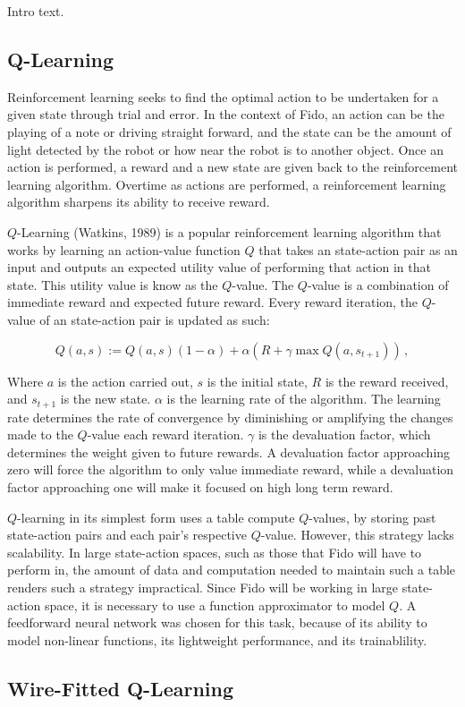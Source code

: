 Intro text.

\subsection{Q-Learning}

Reinforcement learning seeks to find the optimal action to be undertaken for a given state through trial and error. In the context of Fido, an action can be the playing of a note or driving straight forward, and the state can be the amount of light detected by the robot or how near the robot is to another object. Once an action is performed, a reward and a new state are given back to the reinforcement learning algorithm. Overtime as actions are performed, a reinforcement learning algorithm sharpens its ability to receive reward.

$Q$-Learning (Watkins, 1989) is a popular reinforcement learning algorithm that works by learning an action-value function $Q$ that takes an state-action pair as an input and outputs an expected utility value of performing that action in that state. This utility value is know as the $Q$-value. The $Q$-value is a combination of immediate reward and expected future reward. Every reward iteration, the $Q$-value of an state-action pair is updated as such:

\begin{equation}
	Q(a, s) := Q(a, s)(1 - \alpha) + \alpha(R + \gamma \max Q(a, s_{t+1}))
	\,,
\end{equation}

Where $a$ is the action carried out, $s$ is the initial state, $R$ is the reward received, and $s_{t+1}$ is the new state. $\alpha$ is the learning rate of the algorithm. The learning rate determines the rate of convergence by diminishing or amplifying the changes made to the $Q$-value each reward iteration. $\gamma$ is the devaluation factor, which determines the weight given to future rewards. A devaluation factor approaching zero will force the algorithm to only value immediate reward, while a devaluation factor approaching one will make it focused on high long term reward.


$Q$-learning in its simplest form uses a table compute $Q$-values, by storing past state-action pairs and each pair's respective $Q$-value. However, this strategy lacks scalability. In large state-action spaces, such as those that Fido will have to perform in, the amount of data and computation needed to maintain such a table renders such a strategy impractical. Since Fido will be working in large state-action space, it is necessary to use a function approximator to model $Q$. A feedforward neural network was chosen for this task, because of its ability to model non-linear functions, its lightweight performance, and its trainablility.

\subsection{Wire-Fitted Q-Learning}
